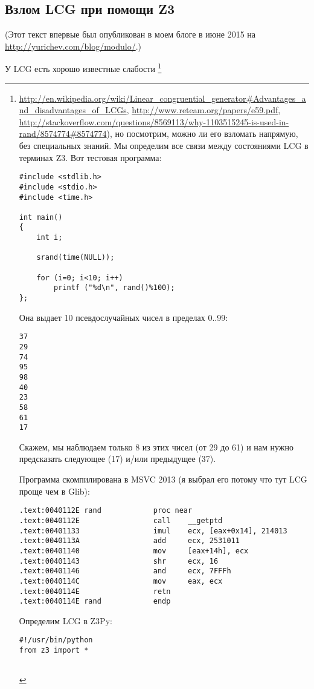 \subsection{Взлом \ac{LCG} при помощи Z3}

(Этот текст впервые был опубликован в моем блоге в июне 2015 на \url{http://yurichev.com/blog/modulo/}.)

У \ac{LCG} есть хорошо известные слабости
\footnote{\url{http://en.wikipedia.org/wiki/Linear_congruential_generator#Advantages_and_disadvantages_of_LCGs},
\url{http://www.reteam.org/papers/e59.pdf},
\url{http://stackoverflow.com/questions/8569113/why-1103515245-is-used-in-rand/8574774#8574774}),
но посмотрим, можно ли его взломать напрямую, без специальных знаний.
Мы определим все связи между состояниями LCG в терминах Z3.
Вот тестовая программа:

\begin{lstlisting}
#include <stdlib.h>
#include <stdio.h>
#include <time.h>

int main()
{
	int i;

	srand(time(NULL));

	for (i=0; i<10; i++)
		printf ("%d\n", rand()%100);
};
\end{lstlisting}

Она выдает 10 псевдослучайных чисел в пределах 0..99:

\begin{lstlisting}
37
29
74
95
98
40
23
58
61
17
\end{lstlisting}

Скажем, мы наблюдаем только 8 из этих чисел (от 29 до 61) и нам нужно предсказать следующее (17) и/или предыдущее (37).

Программа скомпилирована в MSVC 2013 (я выбрал его потому что тут LCG проще чем в Glib):

\begin{lstlisting}
.text:0040112E rand            proc near
.text:0040112E                 call    __getptd
.text:00401133                 imul    ecx, [eax+0x14], 214013
.text:0040113A                 add     ecx, 2531011
.text:00401140                 mov     [eax+14h], ecx
.text:00401143                 shr     ecx, 16
.text:00401146                 and     ecx, 7FFFh
.text:0040114C                 mov     eax, ecx
.text:0040114E                 retn
.text:0040114E rand            endp
\end{lstlisting}

Определим \ac{LCG} в Z3Py:

\begin{lstlisting}
#!/usr/bin/python
from z3 import *


\end{lstlisting}}
